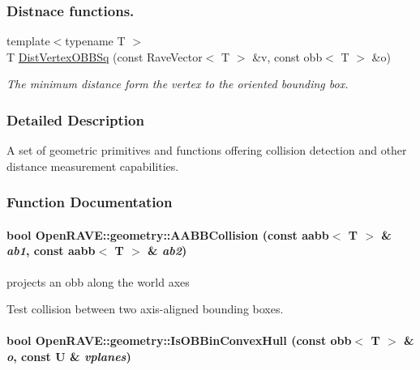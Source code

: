 \subsubsection*{Distnace functions.}
\label{_amgrpb5b6051cc2ee505e55561aa9d30eee1e}
 \begin{DoxyCompactItemize}
\item 
\hypertarget{group__geometric__primitives_ga9b1575cfd9a4571c57d72449b303ba6e}{
{\footnotesize template$<$typename T $>$ }\\T \hyperlink{group__geometric__primitives_ga9b1575cfd9a4571c57d72449b303ba6e}{DistVertexOBBSq} (const RaveVector$<$ T $>$ \&v, const obb$<$ T $>$ \&o)}
\label{group__geometric__primitives_ga9b1575cfd9a4571c57d72449b303ba6e}

\begin{DoxyCompactList}\small\item\em The minimum distance form the vertex to the oriented bounding box. \item\end{DoxyCompactList}\end{DoxyCompactItemize}


\subsubsection{Detailed Description}
A set of geometric primitives and functions offering collision detection and other distance measurement capabilities. 

\subsubsection{Function Documentation}
\hypertarget{group__geometric__primitives_gaa3201f1b56aca79d1fd12499f5c66e50}{
\paragraph[{AABBCollision}]{\setlength{\rightskip}{0pt plus 5cm}bool OpenRAVE::geometry::AABBCollision (const aabb$<$ T $>$ \& {\em ab1}, \/  const aabb$<$ T $>$ \& {\em ab2})}\hfill}
\label{group__geometric__primitives_gaa3201f1b56aca79d1fd12499f5c66e50}


projects an obb along the world axes 

Test collision between two axis-\/aligned bounding boxes. \hypertarget{group__geometric__primitives_ga0d29be0998203e5a7b521ccb728533f6}{
\paragraph[{IsOBBinConvexHull}]{\setlength{\rightskip}{0pt plus 5cm}bool OpenRAVE::geometry::IsOBBinConvexHull (const obb$<$ T $>$ \& {\em o}, \/  const U \& {\em vplanes})}\hfill}
\label{group__geometric__primitives_ga0d29be0998203e5a7b521ccb728533f6}


